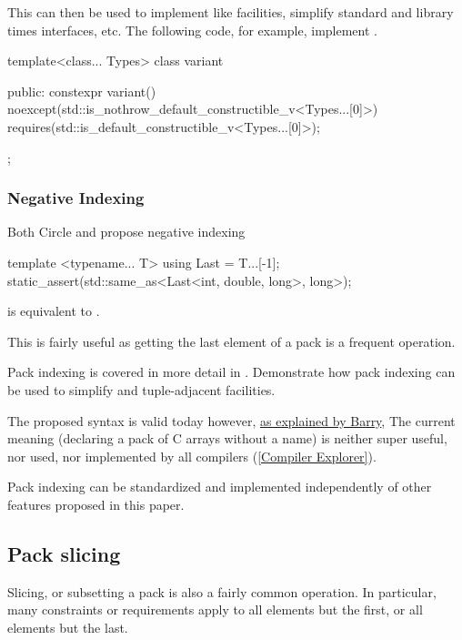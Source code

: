 \documentclass{wg21}
\begin{document}
This can then be used to implement  like facilities, simplify standard and library times interfaces, etc.
The following code, for example, implement .

\begin{colorblock}
template<class... Types>
class variant {
public:
    constexpr variant()
    noexcept(std::is_nothrow_default_constructible_v<Types...[0]>)
    requires(std::is_default_constructible_v<Types...[0]>);

};
\end{colorblock}

\subsubsection{Negative Indexing}

Both Circle and  propose negative indexing

\begin{colorblock}
template <typename... T>
using Last = T...[-1];
static_assert(std::same_as<Last<int, double, long>, long>);
\end{colorblock}

 is equivalent to .


This is fairly useful as getting the last element of a pack is a frequent operation.


Pack indexing is covered in more detail in .  Demonstrate how pack indexing can be used to simplify
 and tuple-adjacent facilities.

The proposed syntax is valid today however, \href{https://www.open-std.org/jtc1/sc22/wg21/docs/papers/2020/p1858r2.html#pack-indexing-ambiguity}{as explained by Barry},
The current meaning (declaring a pack of C arrays without a name) is neither super useful, nor used, nor implemented by all compilers (\href{https://godbolt.org/z/6obhffPTP}{[Compiler Explorer]}).

Pack indexing can be standardized and implemented independently of other features proposed in this paper.


\subsection{Pack slicing}

Slicing, or subsetting a pack is also a fairly common operation.
In particular, many constraints or requirements apply to all elements but the first, or all elements but the last.
\end{document}
